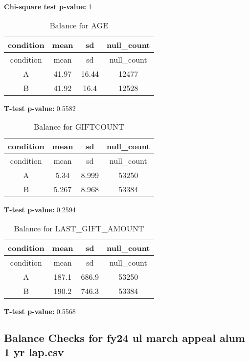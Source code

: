 \documentclass[
]{article}
\begin{document}
\textbf{Chi-square test p-value:} 1\\
\pagebreak

\begin{longtable}[]{@{}cccc@{}}
\caption{Balance for AGE}\tabularnewline
\toprule\noalign{}
condition & mean & sd & null\_count \\
\midrule\noalign{}
\endfirsthead
\toprule\noalign{}
condition & mean & sd & null\_count \\
\midrule\noalign{}
\endhead
\bottomrule\noalign{}
\endlastfoot
A & 41.97 & 16.44 & 12477 \\
B & 41.92 & 16.4 & 12528 \\
\end{longtable}

\textbf{T-test p-value:} 0.5582\\
\pagebreak

\begin{longtable}[]{@{}cccc@{}}
\caption{Balance for GIFTCOUNT}\tabularnewline
\toprule\noalign{}
condition & mean & sd & null\_count \\
\midrule\noalign{}
\endfirsthead
\toprule\noalign{}
condition & mean & sd & null\_count \\
\midrule\noalign{}
\endhead
\bottomrule\noalign{}
\endlastfoot
A & 5.34 & 8.999 & 53250 \\
B & 5.267 & 8.968 & 53384 \\
\end{longtable}

\textbf{T-test p-value:} 0.2594\\
\pagebreak

\begin{longtable}[]{@{}cccc@{}}
\caption{Balance for LAST\_GIFT\_AMOUNT}\tabularnewline
\toprule\noalign{}
condition & mean & sd & null\_count \\
\midrule\noalign{}
\endfirsthead
\toprule\noalign{}
condition & mean & sd & null\_count \\
\midrule\noalign{}
\endhead
\bottomrule\noalign{}
\endlastfoot
A & 187.1 & 686.9 & 53250 \\
B & 190.2 & 746.3 & 53384 \\
\end{longtable}

\textbf{T-test p-value:} 0.5568\\
\pagebreak

\subsection{Balance Checks for fy24 ul march appeal alum 1 yr
lap.csv}\label{balance-checks-for-fy24-ul-march-appeal-alum-1-yr-lap.csv}
\end{document}
